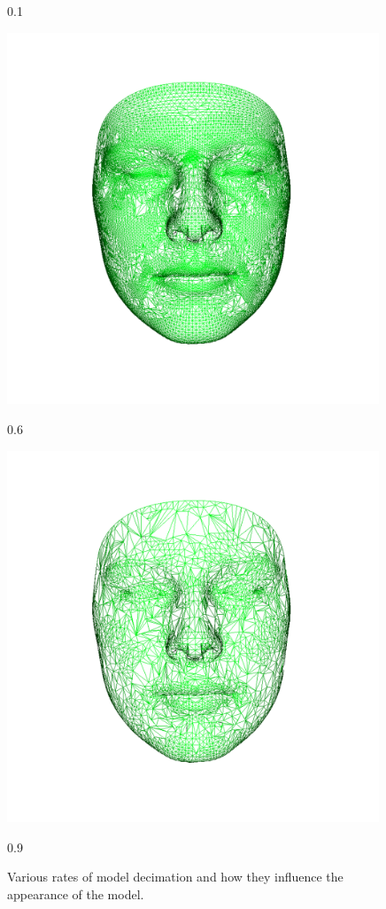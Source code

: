 \begin{figure}[h]
\begin{minipage}{.325\textwidth}
    \caption*{0.1}
  \end{minipage}
  \begin{minipage}{.325\textwidth}
    \centering
    \includegraphics[width=0.99\textwidth]{Figures/Pictures/d06_t.png}
    \caption*{0.6}
  \end{minipage}
  \begin{minipage}{.325\textwidth}
    \centering
    \includegraphics[width=0.99\textwidth]{Figures/Pictures/d09_t.png}
    \caption*{0.9}
  \end{minipage}
  \caption{Various rates of model decimation and how they influence the appearance of the model.}
  \label{f3.14}
\end{figure}

